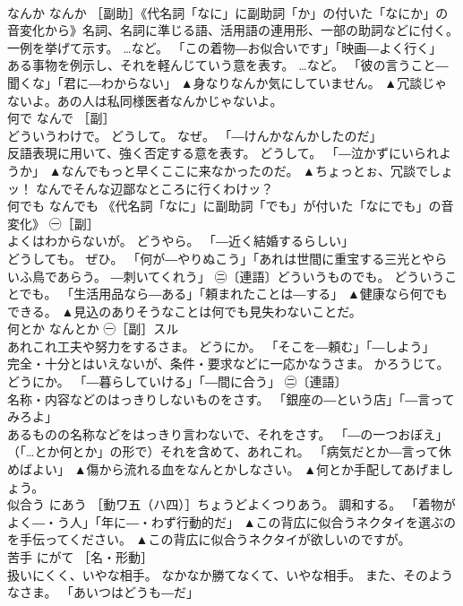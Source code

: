 \documentclass[8pt]{extreport}
\begin{document}
\begin{CJK}{UTF8}{min}
\\	なんか	なんか	［副助］《代名詞「なに」に副助詞「か」の付いた「なにか」の音変化から》名詞、名詞に準じる語、活用語の連用形、一部の助詞などに付く。 
\\	一例を挙げて示す。 …など。 「この着物―お似合いです」「映画―よく行く」 
\\	ある事物を例示し、それを軽んじていう意を表す。 …など。 「彼の言うこと―聞くな」「君に―わからない」	▲身なりなんか気にしていません。 ▲冗談じゃないよ。あの人は私同様医者なんかじゃないよ。
\\	何で	なんで	［副］ 
\\	どういうわけで。 どうして。 なぜ。 「―けんかなんかしたのだ」 
\\	反語表現に用いて、強く否定する意を表す。 どうして。 「―泣かずにいられようか」	▲なんでもっと早くここに来なかったのだ。 ▲ちょっとぉ、冗談でしょッ！ なんでそんな辺鄙なところに行くわけッ？
\\	何でも	なんでも	《代名詞「なに」に副助詞「でも」が付いた「なにでも」の音変化》 ㊀［副］ 
\\	よくはわからないが。 どうやら。 「―近く結婚するらしい」 
\\	どうしても。 ぜひ。 「何が―やりぬこう」「あれは世間に重宝する三光とやらいふ鳥であらう。 ―刺いてくれう」 ㊁〔連語〕どういうものでも。 どういうことでも。 「生活用品なら―ある」「頼まれたことは―する」	▲健康なら何でもできる。 ▲見込のありそうなことは何でも見失わないことだ。
\\	何とか	なんとか	㊀［副］スル 
\\	あれこれ工夫や努力をするさま。 どうにか。 「そこを―頼む」「―しよう」 
\\	完全・十分とはいえないが、条件・要求などに一応かなうさま。 かろうじて。 どうにか。 「―暮らしていける」「―間に合う」 ㊁〔連語〕 
\\	名称・内容などのはっきりしないものをさす。 「銀座の―という店」「―言ってみろよ」 
\\	あるものの名称などをはっきり言わないで、それをさす。 「―の一つおぼえ」 
\\	（「…とか何とか」の形で）それを含めて、あれこれ。 「病気だとか―言って休めばよい」	▲傷から流れる血をなんとかしなさい。 ▲何とか手配してあげましょう。
\\	似合う	にあう	［動ワ五（ハ四）］ちょうどよくつりあう。 調和する。 「着物がよく―・う人」「年に―・わず行動的だ」	▲この背広に似合うネクタイを選ぶのを手伝ってください。 ▲この背広に似合うネクタイが欲しいのですが。
\\	苦手	にがて	［名・形動］ 
\\	扱いにくく、いやな相手。 なかなか勝てなくて、いやな相手。 また、そのようなさま。 「あいつはどうも―だ」 

\end{CJK}
\end{document}
